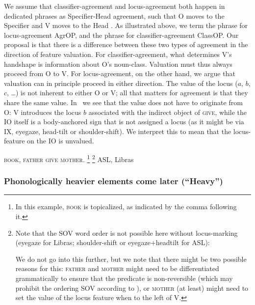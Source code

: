 \documentclass[output=paper]{langscibook}
\begin{document}
We assume that classifier-agreement and locus-agreement both
happen in dedicated phrases as Specifier-Head agreement, such that O
moves to the Specifier and V moves to the Head \citep{Benedicto.Brentari.2004,Kuhn.2016}. 
As illustrated above, we term the phrase
for locus-agreement AgrOP, and the phrase for classifier-agreement
ClassOP. Our proposal is that there is a difference between these two types
of agreement in the direction of feature valuation. For
classifier-agreement, what determines V’s handshape is information
about O’s noun-class. Valuation must thus always proceed from O to
V. For locus-agreement, on the other hand, we argue that valuation can
in principle proceed in either direction. The value of the locus ($a$, $b$, $c$,
\ldots) is not inherent to either O or V; all that matters for agreement is
that they share the same value. In~ we see that the value does not
have to originate from O: V introduces the locus $b$ associated with the
indirect object of \textsc{give}, while the IO itself is a body-anchored sign
that is not assigned a locus (as it might be via IX, eyegaze, head-tilt or
shoulder-shift). We interpret this to mean that the locus-feature on the
IO is unvalued.

\ea 
    \label{lasz:ex:12}
    \textsc{book}, \textsc{father} \textsc{give} \textsc{mother}.%
    \footnote{%
        In this example, \textsc{book} is topicalized, as indicated by the comma
        following it.
    }%
    \footnote{%
        Note that the SOV word order is not possible here without locus-marking
        (eyegaze for Libras; shoulder-shift or eyegaze+headtilt for ASL):
        \begin{exe}  \end{exe}
        We do not go into this further, but we note that there might be two possible reasons
        for this: \textsc{father} and \textsc{mother} might need to be differentiated grammatically to
        ensure that the predicate is non-reversible (which may prohibit the ordering SOV
        according to \citealp{Fischer.1974}), or \textsc{mother} (at least) might need to set the value of the
        locus feature when to the left of V.
    }
    \hfill 
    \cmark ASL,
    \cmark Libras 
    \\
\z 

\subsubsection{Phonologically heavier elements come later (``Heavy'')}
\end{document}
